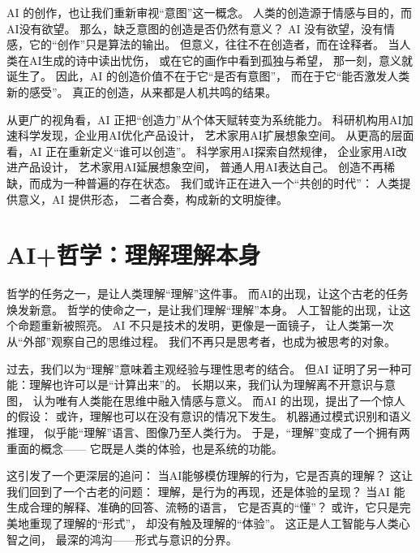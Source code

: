 AI 的创作，也让我们重新审视“意图”这一概念。  
人类的创造源于情感与目的，而AI没有欲望。  
那么，缺乏意图的创造是否仍然有意义？  
AI 没有欲望，没有情感，它的“创作”只是算法的输出。  
但意义，往往不在创造者，而在诠释者。  
当人类在AI生成的诗中读出忧伤，  
或在它的画作中看到孤独与希望，  
那一刻，意义就诞生了。  
因此，AI 的创造价值不在于它“是否有意图”，  
而在于它“能否激发人类新的感受”。  
真正的创造，从来都是人机共鸣的结果。

从更广的视角看，AI 正把“创造力”从个体天赋转变为系统能力。  
科研机构用AI加速科学发现，企业用AI优化产品设计，  
艺术家用AI扩展想象空间。  
从更高的层面看，AI 正在重新定义“谁可以创造”。  
科学家用AI探索自然规律，  
企业家用AI改进产品设计，  
艺术家用AI延展想象空间，  
普通人用AI表达自己。  
创造不再稀缺，而成为一种普遍的存在状态。  
我们或许正在进入一个“共创的时代”：  
人类提供意义，AI 提供形态，  
二者合奏，构成新的文明旋律。

\section{AI+哲学：理解理解本身}

哲学的任务之一，是让人类理解“理解”这件事。  
而AI的出现，让这个古老的任务焕发新意。  
哲学的使命之一，是让我们理解“理解”本身。  
人工智能的出现，让这个命题重新被照亮。  
AI 不只是技术的发明，更像是一面镜子，  
让人类第一次从“外部”观察自己的思维过程。  
我们不再只是思考者，也成为被思考的对象。

过去，我们以为“理解”意味着主观经验与理性思考的结合。  
但AI 证明了另一种可能：理解也许可以是“计算出来”的。  
长期以来，我们认为理解离不开意识与意图，  
认为唯有人类能在思维中融入情感与意义。  
而AI 的出现，提出了一个惊人的假设：  
或许，理解也可以在没有意识的情况下发生。  
机器通过模式识别和语义推理，  
似乎能“理解”语言、图像乃至人类行为。  
于是，“理解”变成了一个拥有两重面的概念——  
它既是人类的体验，也是系统的功能。

这引发了一个更深层的追问：  
当AI能够模仿理解的行为，它是否真的理解？  
这让我们回到了一个古老的问题：  
理解，是行为的再现，还是体验的呈现？  
当AI 能生成合理的解释、准确的回答、流畅的语言，  
它是否真的“懂”？  
或许，它只是完美地重现了理解的“形式”，  
却没有触及理解的“体验”。  
这正是人工智能与人类心智之间，  
最深的鸿沟——形式与意识的分界。

